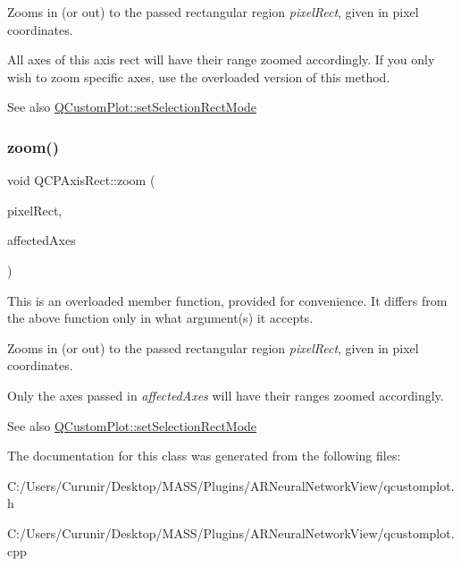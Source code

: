 Zooms in (or out) to the passed rectangular region {\itshape pixel\+Rect}, given in pixel coordinates.

All axes of this axis rect will have their range zoomed accordingly. If you only wish to zoom specific axes, use the overloaded version of this method.

\begin{DoxySeeAlso}{See also}
\hyperlink{class_q_custom_plot_a810ef958ebe84db661c7288b526c0deb}{Q\+Custom\+Plot\+::set\+Selection\+Rect\+Mode} 
\end{DoxySeeAlso}
\mbox{\label{class_q_c_p_axis_rect_a6a39fb3aea60a8c503bdcb3f0477d2f6}} 
\subsubsection{\texorpdfstring{zoom()}{zoom()}\hspace{0.1cm}{\footnotesize\ttfamily [2/2]}}
{\footnotesize\ttfamily void Q\+C\+P\+Axis\+Rect\+::zoom (\begin{DoxyParamCaption}\item[{const Q\+RectF \&}]{pixel\+Rect,  }\item[{const \hyperlink{class_q_list}{Q\+List}$<$ \hyperlink{class_q_c_p_axis}{Q\+C\+P\+Axis} $\ast$$>$ \&}]{affected\+Axes }\end{DoxyParamCaption})}

This is an overloaded member function, provided for convenience. It differs from the above function only in what argument(s) it accepts.

Zooms in (or out) to the passed rectangular region {\itshape pixel\+Rect}, given in pixel coordinates.

Only the axes passed in {\itshape affected\+Axes} will have their ranges zoomed accordingly.

\begin{DoxySeeAlso}{See also}
\hyperlink{class_q_custom_plot_a810ef958ebe84db661c7288b526c0deb}{Q\+Custom\+Plot\+::set\+Selection\+Rect\+Mode} 
\end{DoxySeeAlso}


The documentation for this class was generated from the following files\+:\begin{DoxyCompactItemize}
\item 
C\+:/\+Users/\+Curunir/\+Desktop/\+M\+A\+S\+S/\+Plugins/\+A\+R\+Neural\+Network\+View/qcustomplot.\+h\item 
C\+:/\+Users/\+Curunir/\+Desktop/\+M\+A\+S\+S/\+Plugins/\+A\+R\+Neural\+Network\+View/qcustomplot.\+cpp\end{DoxyCompactItemize}
